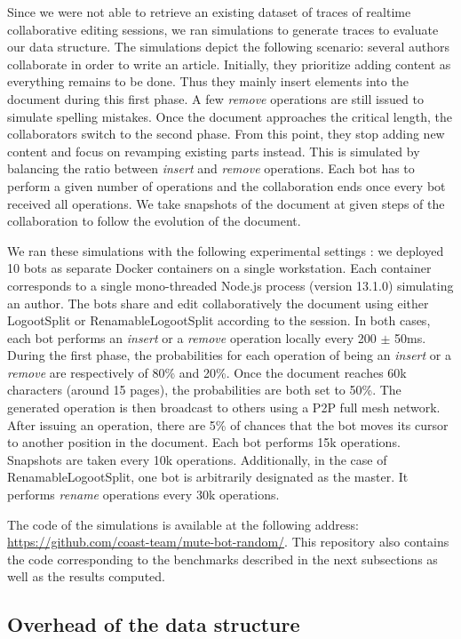 \documentclass{article}
\theoremstyle{definition}
\begin{document}
Since we were not able to retrieve an existing dataset of traces of realtime collaborative editing sessions, we ran simulations to generate traces to evaluate our data structure.
The simulations depict the following scenario: several authors collaborate in order to write an article.
Initially, they prioritize adding content as everything remains to be done.
Thus they mainly insert elements into the document during this first phase.
A few \emph{remove} operations are still issued to simulate spelling mistakes.
Once the document approaches the critical length, the collaborators switch to the second phase.
From this point, they stop adding new content and focus on revamping existing parts instead.
This is simulated by balancing the ratio between \emph{insert} and \emph{remove} operations.
Each bot has to perform a given number of operations and the collaboration ends once every bot received all operations.
We take snapshots of the document at given steps of the collaboration to follow the evolution of the document.

We ran these simulations with the following experimental settings : we deployed 10 bots as separate Docker containers on a single workstation.
Each container corresponds to a single mono-threaded Node.js process (version 13.1.0) simulating an author.
The bots share and edit collaboratively the document using either LogootSplit or RenamableLogootSplit according to the session.
In both cases, each bot performs an \emph{insert} or a \emph{remove} operation locally every 200 $\pm$ 50ms.
During the first phase, the probabilities for each operation of being an \emph{insert} or a \emph{remove} are respectively of 80\% and 20\%.
Once the document reaches 60k characters (around 15 pages), the probabilities are both set to 50\%.
The generated operation is then broadcast to others using a \ac{P2P} full mesh network.
After issuing an operation, there are 5\% of chances that the bot moves its cursor to another position in the document.
Each bot performs 15k operations.
Snapshots are taken every 10k operations.
Additionally, in the case of RenamableLogootSplit, one bot is arbitrarily designated as the master.
It performs \emph{rename} operations every 30k operations.

The code of the simulations is available at the following address: \url{https://github.com/coast-team/mute-bot-random/}.
This repository also contains the code corresponding to the benchmarks described in the next subsections as well as the results computed.

\subsection{Overhead of the data structure}
\end{document}
